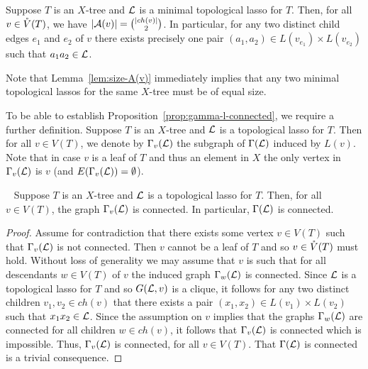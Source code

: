 \begin{lem}\label{lem:size-A(v)}
Suppose $T$ is an $X$-tree and ${\mathcal L}$ is a minimal topological 
lasso for $T$. Then, for all $v\in \mathring{V}(T)$, we have 
$|{\mathcal A}(v)|={|ch(v)|\choose 2}$. In particular, for any two distinct child 
edges $e_1$ and 
$e_2$ of $v$ there exists precisely one pair 
$(a_1,a_2)\in L(v_{e_1})\times L(v_{e_2})$ such that 
$a_1a_2\in{\mathcal L}$.
\end{lem}

Note that Lemma~\ref{lem:size-A(v)} immediately implies that
any two minimal topological lassos for the same $X$-tree must
be of equal size. 

To be able to establish Proposition~\ref{prop:gamma-l-connected}, 
we require a further definition.
Suppose $T$ is an $X$-tree and ${\mathcal L}$ is a topological 
lasso for $T$. Then for all $v\in V(T)$, we denote by $\Gamma_v({\mathcal L})$
the subgraph of $\Gamma({\mathcal L})$ induced by $L(v)$. Note that
in case $v$ is a leaf of $T$ and thus an element in $X$
the only vertex in $\Gamma_v({\mathcal L})$ is $v$ (and 
$E(\Gamma_v({\mathcal L}))=\emptyset$).


\begin{pro}~\label{prop:gamma-l-connected}
Suppose $T$ is an $X$-tree and ${\mathcal L}$ is a topological lasso for $T$. 
Then, for all $v\in V(T)$, the graph $\Gamma_v({\mathcal L})$ is connected. 
In particular, 
$\Gamma({\mathcal L})$ is connected.
\end{pro}
\begin{proof}
Assume for contradiction that there exists some vertex $v\in V(T)$
such that  $\Gamma_v({\mathcal L})$ is not connected. Then $v$ cannot be
a leaf of $T$ and so $v\in \mathring{V}(T)$ must hold. Without loss of generality
we may assume that $v$ is such that for all descendants $w\in V(T)$ of $v$
the induced graph $\Gamma_w({\mathcal L})$ is connected. Since ${\mathcal L}$
is  a topological lasso for $T$ and so $G({\mathcal L},v)$ is a clique,
it follows for any two distinct children $v_1,v_2\in ch(v)$  that 
there exists a pair $(x_1,x_2)\in L(v_1)\times L(v_2)$
such that $x_1x_2\in {\mathcal L}$.  Since the assumption on $v$ implies 
that the graphs 
$\Gamma_{w}({\mathcal L})$ are connected for all children $w\in ch(v)$,   
it follows that $\Gamma_v({\mathcal L})$ is connected which is impossible.
Thus, $\Gamma_v({\mathcal L})$ is connected, for all  $v\in V(T)$.
That $\Gamma({\mathcal L})$ is connected is a trivial consequence.
\qquad
\end{proof}


